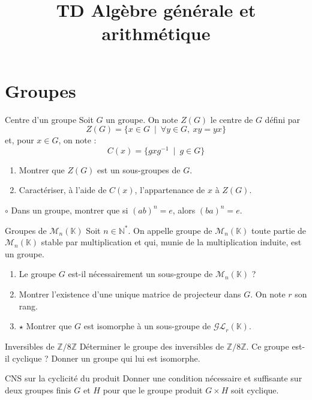 \documentclass[french,a4paper]{article}
\title{TD Algèbre générale et arithmétique}
\newcommand{\N}{\mathbb{N}}
\newcommand{\Z}{\mathbb{Z}}
\newcommand{\K}{\mathbb{K}}
\newcommand{\st}{^*}
\newcommand{\inv}{^{-1}}
\theoremstyle{plain}
\theoremstyle{definition}
\theoremstyle{remark}
\begin{document}
\maketitle

\section{Groupes}

\begin{ex}[Moulin.AG.01]{Centre d'un groupe}
	Soit $G$ un groupe. On note $Z(G)$ le centre de $G$ défini par $$Z(G)=\{x\in G\ \mid \ \forall y\in G,\ xy=yx\}$$ et, pour $x\in G$, on note : $$C(x)=\{gxg\inv\ \mid\ g\in G\}$$
	\begin{enumerate}
		\item Montrer que $Z(G)$ est un sous-groupes de $G$.
		\item Caractériser, à l'aide de $C(x)$, l'appartenance de $x$ à $Z(G)$.
	\end{enumerate}
\end{ex}

\begin{ex}[Moulin.AG.02]{$\circ$}
	Dans un groupe, montrer que si $(ab)^n=e$, alors $(ba)^n=e$.
\end{ex}

\begin{ex}[Moulin.AG.03]{Groupes de $\mathcal{M}_n(\K)$}
	Soit $n\in\N\st$. On appelle groupe de $\mathcal{M}_n(\K)$ toute partie de $\mathcal{M}_n(\K)$ stable par multiplication et qui, munie de la multiplication induite, est un groupe.
	\begin{enumerate}
		\item Le groupe $G$ est-il nécessairement un sous-groupe de $\mathcal{M}_n(\K)$ ?
		\item Montrer l'existence d'une unique matrice de projecteur dans $G$. On note $r$ son rang.
		\item $\star$ Montrer que $G$ est isomorphe à un sous-groupe de $\mathcal{GL}_r(\K)$.		
	\end{enumerate}
\end{ex}

\begin{ex}[Moulin.AG.04]{Inversibles de $\Z/8\Z$}
	Déterminer le groupe des inversibles de $\Z/8\Z$. Ce groupe est-il cyclique ? Donner un groupe qui lui est isomorphe.
\end{ex}

\begin{ex}[Moulin.AG.05]{CNS sur la cyclicité du produit}
	Donner une condition nécessaire et suffisante sur deux groupes finis $G$ et $H$ pour que le groupe produit $G\times H$ soit cyclique.
\end{ex}
\end{document}
